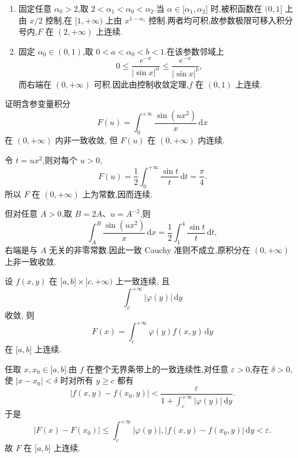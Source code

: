 \begin{solution}
    \begin{enumerate}
        \item 固定任意 $\alpha_0>2$,取 $2<\alpha_1<\alpha_0<\alpha_2$.当
              $\alpha\in\lbrack\alpha_1,\alpha_2\rbrack$ 时,被积函数在 $(0,1\rbrack$ 上由 $x/2$ 控制,在 $\lbrack1,+\infty)$ 上由 $x^{1-\alpha_1}$ 控制.两者均可积,故参数极限可移入积分号内,$F$ 在 $(2,+\infty)$ 上连续.
        \item 固定 $\alpha_0\in(0,1)$,取 $0<a<\alpha_0<b<1$.在该参数邻域上
              \[
                  0\leq\dfrac{e^{-x}}{|\sin x|^\alpha}
                  \leq\dfrac{e^{-x}}{|\sin x|^b},
              \]
              而右端在 $(0,+\infty)$ 可积.因此由控制收敛定理,$f$ 在 $(0,1)$ 上连续.
    \end{enumerate}
\end{solution}

\begin{example}
    证明含参变量积分
    \[
        F(u)=\int_0^{+\infty}\dfrac{\sin(ux^2)}{x}\,\mathrm{d}x
    \]
    在 $(0,+\infty)$ 内非一致收敛, 但 $F(u)$ 在 $(0,+\infty)$ 内连续.
\end{example}
\exampleblank

\begin{solution}
    令 $t=ux^2$,则对每个 $u>0$,
    \[
        F(u)=\dfrac{1}{2}\int_0^{+\infty}\dfrac{\sin t}{t}\,\mathrm{d}t
        =\dfrac{\pi}{4}.
    \]
    所以 $F$ 在 $(0,+\infty)$ 上为常数,因而连续.

    但对任意 $A>0$,取 $B=2A$、$u=A^{-2}$,则
    \[
        \int_A^B\dfrac{\sin(ux^2)}{x}\,\mathrm{d}x
        =\dfrac{1}{2}\int_1^4\dfrac{\sin t}{t}\,\mathrm{d}t,
    \]
    右端是与 $A$ 无关的非零常数.因此一致 Cauchy 准则不成立,原积分在 $(0,+\infty)$ 上非一致收敛.
\end{solution}

\begin{example}
    设 $f(x,y)$ 在 $\lbrack a,b\rbrack\times\lbrack c,+\infty)$ 上一致连续, 且
    \[
        \int_c^{+\infty}|\varphi(y)|\,\mathrm{d}y
    \]
    收敛, 则
    \[
        F(x)=\int_c^{+\infty}\varphi(y)f(x,y)\,\mathrm{d}y
    \]
    在 $\lbrack a,b\rbrack$ 上连续.
\end{example}
\exampleblank

\begin{solution}
    任取 $x,x_0\in\lbrack a,b\rbrack$.由 $f$ 在整个无界条带上的一致连续性,对任意 $\varepsilon>0$,存在 $\delta>0$,使 $|x-x_0|<\delta$ 时对所有 $y\geq c$ 都有
    \[
        |f(x,y)-f(x_0,y)|<\dfrac{\varepsilon}{1+\int_c^{+\infty}|\varphi(y)|\,\mathrm{d}y}.
    \]
    于是
    \[
        |F(x)-F(x_0)|
        \leq\int_c^{+\infty}|\varphi(y)|,|f(x,y)-f(x_0,y)|\,\mathrm{d}y<\varepsilon.
    \]
    故 $F$ 在 $\lbrack a,b\rbrack$ 上连续.
\end{solution}

